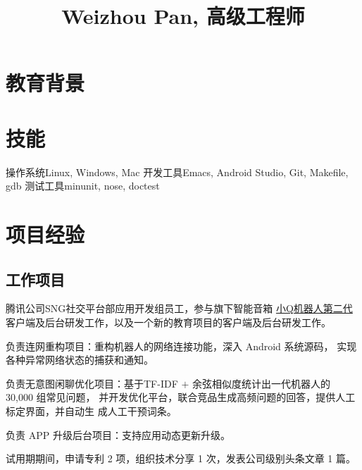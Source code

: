 \documentclass[11pt,a4paper,nolmodern]{moderncv}
\title{Weizhou Pan, 高级工程师}
\begin{document}
\maketitle

\vspace{-3em}

\section{\hei 教育背景}



\section{\hei 技能}

           {操作系统}{Linux, Windows, Mac}
           {开发工具}{Emacs, Android Studio, Git, Makefile, gdb}
           {测试工具}{minunit, nose, doctest}

\section{\hei 项目经验}


\subsection{\hei 工作项目}

{
  \begin{tightitemize}%
  \item 腾讯公司SNG社交平台部应用开发组员工，参与旗下智能音箱
    \href{https://qrobot.qq.com/}{小Q机器人第二代}客户端及后台研发工作，以及一个新的教育项目的客户端及后台研发工作。
  \item 负责连网重构项目：重构机器人的网络连接功能，深入 Android 系统源码，
    实现各种异常网络状态的捕获和通知。
  \item 负责无意图闲聊优化项目：基于TF-IDF $+$ 余弦相似度统计出一代机器人的 30,000 组常见问题，
    并开发优化平台，联合竞品生成高频问题的回答，提供人工标定界面，并自动生
    成人工干预词条。
  \item 负责 APP 升级后台项目：支持应用动态更新升级。
  \item 试用期期间，申请专利 2 项，组织技术分享 1 次，发表公司级别头条文章 1 篇。
  \end{tightitemize}}
\end{document}
